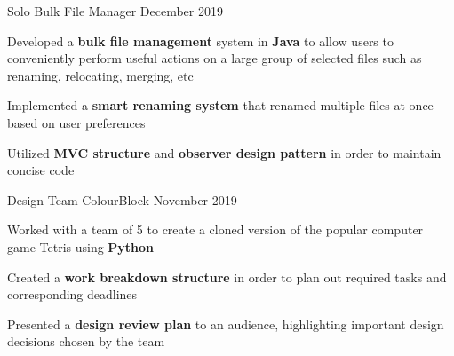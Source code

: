 
\begin{cventries}
  \cventry
    {Solo} %
    {Bulk File Manager} %
    {} %
    {December 2019} %
    {
      \begin{cvitems} %
        \item {Developed a \textbf{bulk file management} system in \textbf{Java} to allow users to conveniently perform useful actions on a large group of selected files such as renaming, relocating, merging, etc}
		\item {Implemented a \textbf{smart renaming system} that renamed multiple files at once based on user preferences}
		\item {Utilized \textbf{MVC structure} and \textbf{observer design pattern} in order to maintain concise code}
      \end{cvitems}
    }

  \cventry
    {Design Team} %
    {ColourBlock} %
    {} %
    {November 2019} %
    {
      \begin{cvitems} %
      	\item {Worked with a team of 5 to create a cloned version of the popular computer game Tetris using \textbf{Python}}
		\item {Created a \textbf{work breakdown structure} in order to plan out required tasks and corresponding deadlines}
		\item {Presented a \textbf{design review plan} to an audience, highlighting important design decisions chosen by the team}
      \end{cvitems}
    }
    

\end{cventries}
